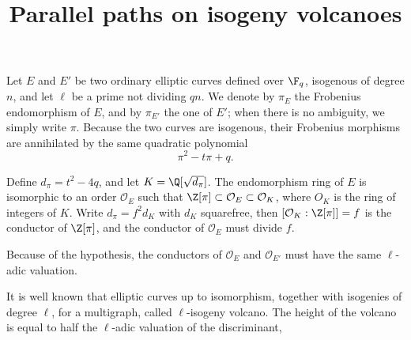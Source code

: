 \documentclass{article}
\title{Parallel paths on isogeny volcanoes}
\renewcommand{\O}{\mathcal{O}}
\begin{document}
\maketitle

Let $E$ and $E'$ be two ordinary elliptic curves defined over $\F_q$,
isogenous of degree $n$, and let $\ell$ be a prime not dividing
$qn$. We denote by $\pi_E$ the Frobenius endomorphism of $E$, and by
$\pi_{E'}$ the one of $E'$; when there is no ambiguity, we simply
write $\pi$. Because the two curves are isogenous, their Frobenius
morphisms are annihilated by the same quadratic polynomial
\[\pi^2 - t\pi + q.\]

Define $d_\pi=t^2-4q$, and let $K=\Q[\sqrt{d_\pi}]$. The endomorphism
ring of $E$ is isomorphic to an order $\O_E$ such that
$\Z[\pi]\subset\O_E\subset\O_K$, where $O_K$ is the ring of integers
of $K$. Write $d_\pi=f^2d_K$ with $d_K$ squarefree, then
$[\O_K:\Z[\pi]]=f$ is the conductor of $\Z[\pi]$, and the conductor of
$\O_E$ must divide $f$.

Because of the hypothesis, the conductors of $\O_E$ and $\O_{E'}$ must
have the same $\ell$-adic valuation.


It is well known that elliptic curves up to isomorphism, together with
isogenies of degree $\ell$, for a multigraph, called $\ell$-isogeny
volcano. The height of the volcano is equal to half the $\ell$-adic
valuation of the discriminant, 
\end{document}
